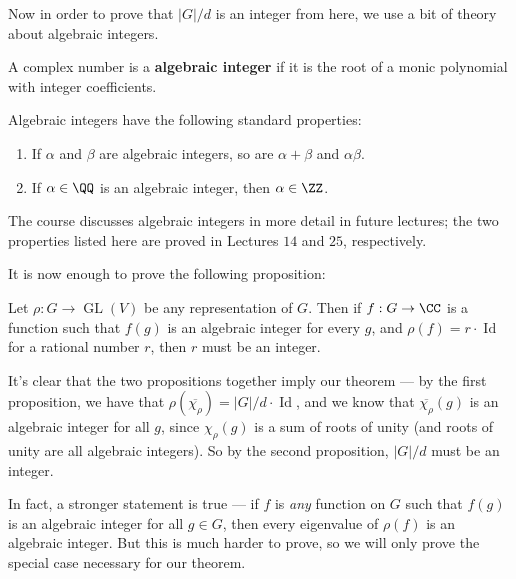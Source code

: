 Now in order to prove that $|G|/d$ is an integer from here, we use a bit of theory about algebraic integers. 


\begin{definition}
    A complex number is a \textbf{algebraic integer} if it is the root of a monic polynomial with integer coefficients. 
\end{definition}

\begin{lemma}
    Algebraic integers have the following standard properties:
    \begin{enumerate}[label=(\alph*)]
        \item If $\alpha$ and $\beta$ are algebraic integers, so are $\alpha + \beta$ and $\alpha\beta$. 
        \item If $\alpha \in \QQ$ is an algebraic integer, then $\alpha \in \ZZ$. 
    \end{enumerate}
\end{lemma}

The course discusses algebraic integers in more detail in future lectures; the two properties listed here are proved in Lectures $14$ and $25$, respectively.  

It is now enough to prove the following proposition:

\begin{proposition}
    Let $\rho : G \to \operatorname{GL}(V)$ be any representation of $G$. Then if $f : G \to \CC$ is a function such that $f(g)$ is an algebraic integer for every $g$, and $\rho(f) = r\cdot \operatorname{Id}$ for a rational number $r$, then $r$ must be an integer. 
\end{proposition}

It's clear that the two propositions together imply our theorem --- by the first proposition, we have that $\rho(\overline{\chi_\rho}) = |G|/d\cdot \operatorname{Id}$, and we know that $\overline{\chi_\rho}(g)$ is an algebraic integer for all $g$, since $\chi_\rho(g)$ is a sum of roots of unity (and roots of unity are all algebraic integers). So by the second proposition, $|G|/d$ must be an integer. 

In fact, a stronger statement is true --- if $f$ is \emph{any} function on $G$ such that $f(g)$ is an algebraic integer for all $g \in G$, then every eigenvalue of $\rho(f)$ is an algebraic integer. But this is much harder to prove, so we will only prove the special case necessary for our theorem.

